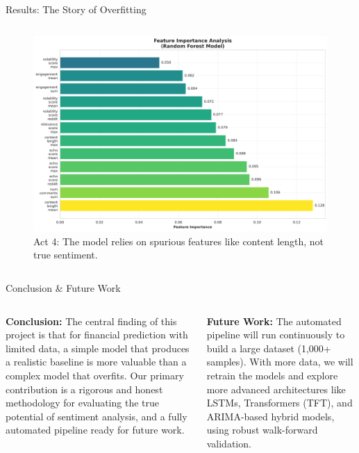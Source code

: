 \documentclass[final]{beamer}
\begin{document}
\begin{frame}[t]
\begin{columns}[T]
\begin{column}{0.6\linewidth}
\begin{block}{Results: The Story of Overfitting}
\begin{columns}[T]
\begin{column}{0.5\linewidth}
\begin{figure}
                    \includegraphics[width=\linewidth]{analysis/visualizations/plots/feature_importance.png}
                    \caption{Act 4: The model relies on spurious features like content length, not true sentiment.}
                \end{figure}
            \end{column}
        \end{columns}
      \end{block}
    \end{column}
  \end{columns}

  \vspace{0.5cm}

  \begin{block}{Conclusion & Future Work}
    \small
    \begin{columns}[T]
        \begin{column}{0.5\linewidth}
            \textbf{Conclusion:}
            The central finding of this project is that for financial prediction with limited data, a simple model that produces a realistic baseline is more valuable than a complex model that overfits. Our primary contribution is a rigorous and honest methodology for evaluating the true potential of sentiment analysis, and a fully automated pipeline ready for future work.
        \end{column}
        \begin{column}{0.5\linewidth}
            \textbf{Future Work:}
            The automated pipeline will run continuously to build a large dataset (1,000+ samples). With more data, we will retrain the models and explore more advanced architectures like LSTMs, Transformers (TFT), and ARIMA-based hybrid models, using robust walk-forward validation.
        \end{column}
    \end{columns}
  \end{block}

\end{frame}
\end{document}
